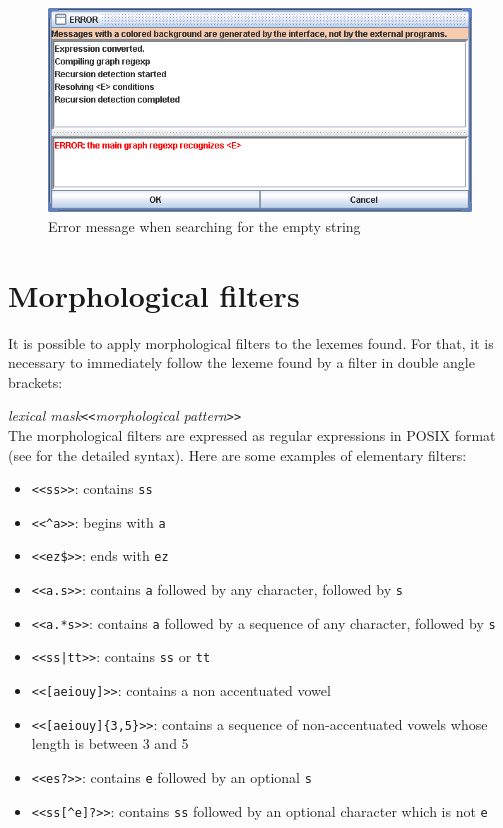 \bigskip
\begin{figure}[!ht]
\begin{center}
\includegraphics[width=14cm]{resources/img/fig4-3.png}
\caption{Error message when searching for the empty
string\label{fig-epsilon-error}}
\end{center}
\end{figure}


\section{Morphological filters}
\label{section-filters}

It is possible to apply morphological filters to the lexemes found. For that, it is necessary to
immediately follow the lexeme found by a filter in double angle brackets:

\bigskip
\noindent
\textit{lexical mask}\verb$<<$\textit{morphological pattern}\verb$>>$ \\


\bigskip{}
\noindent The morphological filters are expressed as regular expressions in POSIX
format (see \cite{TRE} for the detailed syntax). Here are some examples of
elementary filters:



\begin{itemize}
  \item \verb$<<ss>>$: contains \verb$ss$
  \item \verb$<<^a>>$: begins with \verb$a$
  \item \verb+<<ez$>>+: ends with \verb$ez$
  \item \verb$<<a.s>>$: contains \verb$a$ followed by any character, followed by \verb$s$
  \item \verb$<<a.*s>>$: contains \verb$a$ followed by a sequence of any character, followed by \verb$s$
  \item \verb$<<ss|tt>>$: contains \verb$ss$ or \verb$tt$
  \item \verb$<<[aeiouy]>>$: contains a non accentuated vowel
  \item \verb$<<[aeiouy]{3,5}>>$: contains a sequence of non-accentuated vowels whose length 
        is between 3 and 5
  \item \verb$<<es?>>$: contains \verb$e$ followed by an
  optional \verb$s$
  \item \verb$<<ss[^e]?>>$: contains \verb$ss$ followed by an optional character which is not \verb$e$
\end{itemize}

